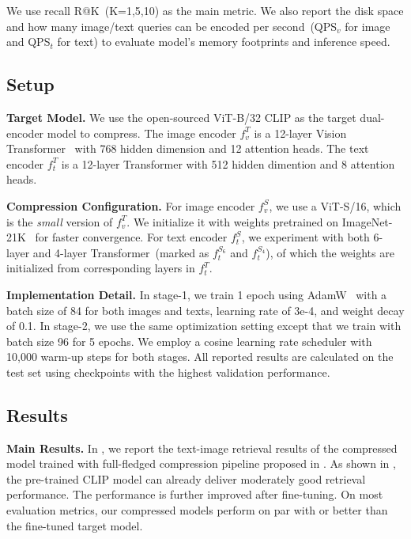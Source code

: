 We use recall R@K~(K=1,5,10) as the main metric. We also report the disk space and how many image/text queries can be encoded per second~(QPS$_v$ for image and QPS$_t$ for text) to evaluate model's memory footprints and inference speed.

\subsection{Setup}

\textbf{Target Model.} We use the open-sourced ViT-B/32 CLIP as the target dual-encoder model to compress. The image encoder $f_v^{T}$ is a 12-layer Vision Transformer~\cite{vit} with 768 hidden dimension and 12 attention heads. The text encoder $f_t^{T}$ is a 12-layer Transformer with 512 hidden dimention and 8 attention heads.


\textbf{Compression Configuration.} For image encoder $f_v^{S}$, we use a ViT-S/16, which is the \textit{small} version of $f_v^{T}$. We initialize it with weights pretrained on ImageNet-21K~\cite{imagenet21k} for faster convergence. For text encoder $f_t^{S}$, we experiment with both 6-layer and 4-layer Transformer~(marked as $f_t^{S_6}$ and $f_t^{S_4}$), of which the weights are initialized from corresponding layers in $f_t^{T}$.

\textbf{Implementation Detail.} In stage-1, we train 1 epoch using AdamW~\cite{adamw} with a batch size of 84 for both images and texts, learning rate of 3e-4, and weight decay of 0.1. In stage-2, we use the same optimization setting except that we train with batch size 96 for 5 epochs. We employ a cosine learning rate scheduler with 10,000 warm-up steps for both stages. All reported results are calculated on the test set using checkpoints with the highest validation performance.

\subsection{Results}



\textbf{Main Results.} In , we report the text-image retrieval results of the compressed model trained with full-fledged compression pipeline proposed in . As shown in , the pre-trained CLIP model can already deliver moderately good retrieval performance. The performance is further improved after fine-tuning. On most evaluation metrics, our compressed models perform on par with or better than the fine-tuned target model.





